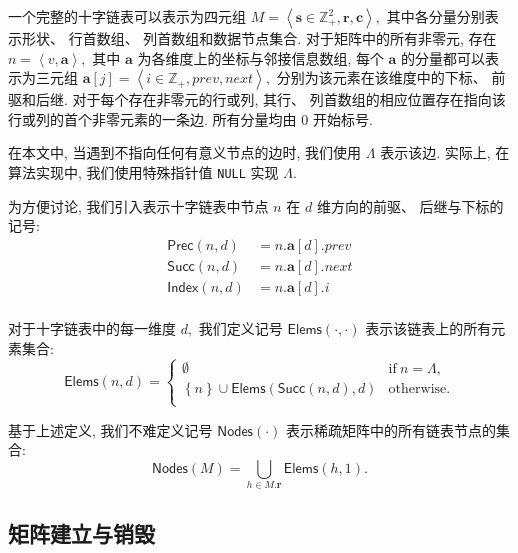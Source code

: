 一个完整的十字链表可以表示为四元组 $M = \left\langle \bm{s} \in \mathbb{Z}_{+}^{2}, \bm{r}, \bm{c} \right\rangle,$ 其中各分量分别表示形状、 行首数组、 列首数组和数据节点集合. 对于矩阵中的所有非零元, 存在 $n = \left\langle v, \bm{a} \right\rangle,$ 其中 $\bm{a}$ 为各维度上的坐标与邻接信息数组, 每个 $\bm{a}$ 的分量都可以表示为三元组 $\bm{a}[j] = \left\langle i \in \mathbb{Z}_+, prev, next\right\rangle,$ 分别为该元素在该维度中的下标、 前驱和后继. 对于每个存在非零元的行或列, 其行、 列首数组的相应位置存在指向该行或列的首个非零元素的一条边. 所有分量均由 0 开始标号.

在本文中, 当遇到不指向任何有意义节点的边时, 我们使用 $\Lambda$ 表示该边. 实际上, 在算法实现中, 我们使用特殊指针值 \texttt{NULL} 实现 $\Lambda.$

\newcommand{\Prec}[2]{\mathsf{Prec}(#1, #2)}
\newcommand{\Succ}[2]{\mathsf{Succ}(#1, #2)}
\newcommand{\Index}[2]{\mathsf{Index}(#1, #2)}
为方便讨论, 我们引入表示十字链表中节点 $n$ 在 $d$ 维方向的前驱、 后继与下标的记号:
\begin{equation}
    \begin{aligned}
        \Prec{n}{d} & = n.\bm{a}[d].prev\\
        \Succ{n}{d} & = n.\bm{a}[d].next\\
        \Index{n}{d} & = n.\bm{a}[d].i\\
    \end{aligned}
\end{equation}

\newcommand{\Elems}[2]{\mathsf{Elems}(#1, #2)}
对于十字链表中的每一维度 $d,$ 我们定义记号 $\Elems{\cdot}{\cdot}$ 表示该链表上的所有元素集合:
\begin{equation}
    \Elems{n}{d} = \begin{cases}
        \emptyset & \text{if}\ n = \Lambda,\\
        \left\{n\right\} \cup \Elems{\Succ{n}{d}}{d} & \text{otherwise}.\\
    \end{cases}
\end{equation}

\newcommand{\Nodes}[1]{\mathsf{Nodes}(#1)}
基于上述定义, 我们不难定义记号 $\Nodes{\cdot}$ 表示稀疏矩阵中的所有链表节点的集合:
\begin{equation}
    \Nodes{M} = \bigcup_{h \in M.\bm{r}} \Elems{h}{1}.
\end{equation}

\subsection{矩阵建立与销毁}

